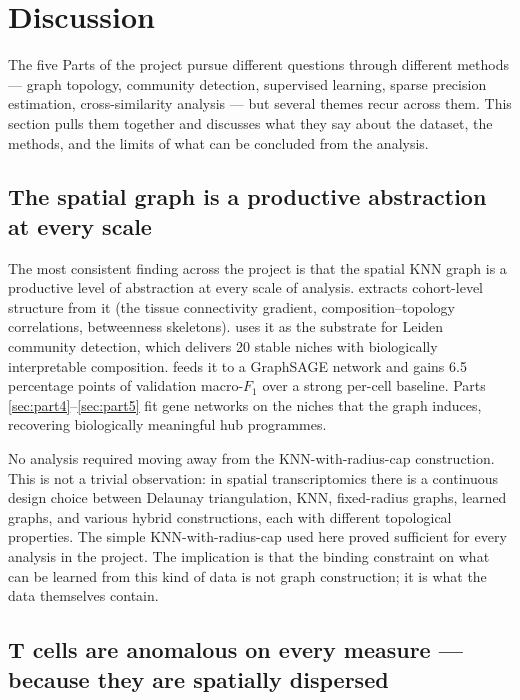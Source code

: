 \section{Discussion}
\label{sec:discussion}

The five Parts of the project pursue different questions through different methods --- graph topology, community detection, supervised learning, sparse precision estimation, cross-similarity analysis --- but several themes recur across them. This section pulls them together and discusses what they say about the dataset, the methods, and the limits of what can be concluded from the analysis.

\subsection*{The spatial graph is a productive abstraction at every scale}

The most consistent finding across the project is that the spatial KNN graph is a productive level of abstraction at every scale of analysis.  extracts cohort-level structure from it (the tissue connectivity gradient, composition--topology correlations, betweenness skeletons).  uses it as the substrate for Leiden community detection, which delivers 20 stable niches with biologically interpretable composition.  feeds it to a GraphSAGE network and gains 6.5 percentage points of validation macro-$F_1$ over a strong per-cell baseline. Parts \ref{sec:part4}--\ref{sec:part5} fit gene networks on the niches that the graph induces, recovering biologically meaningful hub programmes.

No analysis required moving away from the KNN-with-radius-cap construction. This is not a trivial observation: in spatial transcriptomics there is a continuous design choice between Delaunay triangulation, KNN, fixed-radius graphs, learned graphs, and various hybrid constructions, each with different topological properties. The simple KNN-with-radius-cap used here proved sufficient for every analysis in the project. The implication is that the binding constraint on what can be learned from this kind of data is not graph construction; it is what the data themselves contain.

\subsection*{T cells are anomalous on every measure --- because they are spatially dispersed}

